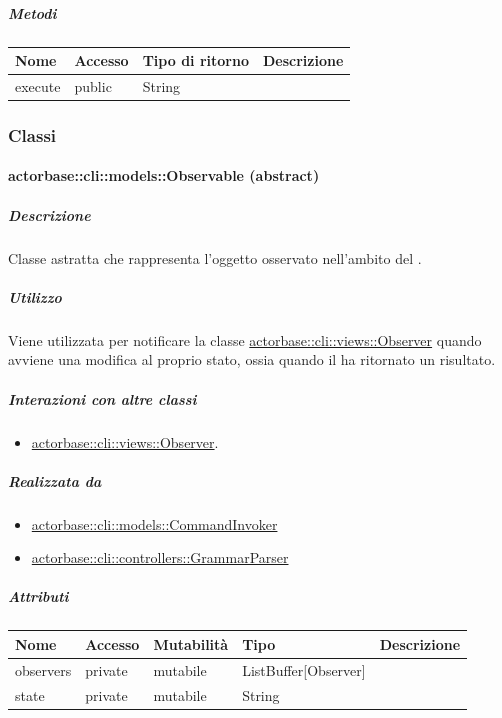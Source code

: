 \documentclass{scalatekids-article}
\begin{document}
\subparagraph{Metodi}

\begin{tabular}{| l | l | l | l |}
  \hline
  Nome & Accesso & Tipo di ritorno & Descrizione\\
  \hline
  execute & public & String & \\
  \hline
\end{tabular}

\subsubsection{Classi}

\paragraph{actorbase::cli::models::Observable (abstract)}
\label{sec:actorbase::cli::models::Observable}

\subparagraph{Descrizione}

Classe astratta che rappresenta l'oggetto osservato nell'ambito del  .

\subparagraph{Utilizzo}

Viene utilizzata per notificare la classe \hyperref[sec:actorbase::cli::views::Observer]{actorbase::cli::views::Observer}
quando avviene una modifica al proprio stato, ossia quando il 
ha ritornato un risultato.

\subparagraph{Interazioni con altre classi}

\begin{itemize}
\item \hyperref[sec:actorbase::cli::views::Observer]{actorbase::cli::views::Observer}.
\end{itemize}

\subparagraph{Realizzata da}

\begin{itemize}
\item \hyperref[sec:actorbase::cli::models::CommandInvoker]{actorbase::cli::models::CommandInvoker}
\item \hyperref[sec:actorbase::cli::controllers::GrammarParser]{actorbase::cli::controllers::GrammarParser}
\end{itemize}

\subparagraph{Attributi}

\begin{tabular}{| l | l | l | l | l |}
  \hline
  Nome & Accesso & Mutabilità & Tipo & Descrizione\\
  \hline
  observers & private & mutabile & ListBuffer[Observer] & \\
  \hline
  state & private & mutabile & String & \\
  \hline
\end{tabular}
\end{document}
